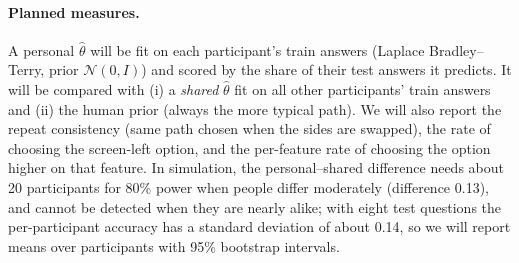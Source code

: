\paragraph{Planned measures.}
A personal $\hat\theta$ will be fit on each participant's train answers (Laplace Bradley--Terry, prior $\mathcal{N}(0,I)$) and scored by the share
of their test answers it predicts. It will be compared with (i) a \emph{shared} $\hat\theta$ fit on all other participants' train answers and
(ii) the human prior (always the more typical path). We will also report the repeat consistency (same path chosen when the sides are swapped),
the rate of choosing the screen-left option, and the per-feature rate of choosing the option higher on that feature.
In simulation, the personal--shared difference needs about 20 participants for 80\% power when people differ moderately
(difference 0.13), and cannot be detected when they are nearly alike; with eight test questions the per-participant accuracy has a
standard deviation of about 0.14, so we will report means over participants with 95\% bootstrap intervals.

